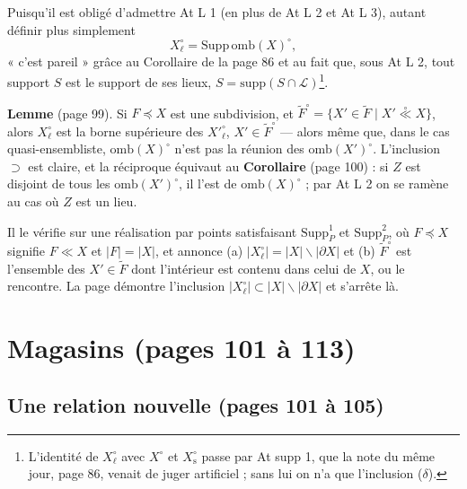 \documentclass[11pt,a4paper]{article}
\begin{document}
Puisqu'il est obligé d'admettre At L 1 (en plus de At L 2 et At L 3), autant
définir plus simplement
\[
X^{\circ}_{\ell} = \mathrm{Supp}\, \mathrm{omb}(X)^{\circ} ,
\]
« c'est pareil » grâce au Corollaire de la page 86 et au fait que, sous At L 2,
tout support $S$ est le support de ses lieux, $S = \mathrm{supp}(S \cap
\mathcal{L})$\footnote{L'identité de $X^{\circ}_{\ell}$ avec $X^{\circ}$ et
$X^{\circ}_{\mathrm{s}}$ passe par At supp 1, que la note du même jour, page 86,
venait de juger artificiel ; sans lui on n'a que l'inclusion ($\delta$).}.

\textbf{Lemme} (page 99). Si $F \preccurlyeq X$ est une subdivision, et
$\widetilde{F}^{\circ} = \{X' \in \widetilde{F} \mid X'
\mathrel{\overset{\circ}{\ll}} X\}$, alors $X^{\circ}_{\ell}$ est la borne
supérieure des $X'^{\circ}_{\ell}$, $X' \in \widetilde{F}^{\circ}$ --- alors même
que, dans le cas quasi-ensembliste, $\mathrm{omb}(X)^{\circ}$ n'est pas la réunion
des $\mathrm{omb}(X')^{\circ}$. L'inclusion $\supset$ est claire, et la réciproque
équivaut au \textbf{Corollaire} (page 100) : si $Z$ est disjoint de tous les
$\mathrm{omb}(X')^{\circ}$, il l'est de $\mathrm{omb}(X)^{\circ}$ ; par At L 2 on se
ramène au cas où $Z$ est un lieu.

Il le vérifie sur une réalisation par points satisfaisant $\mathrm{Supp}^{1}_{P}$
et $\mathrm{Supp}^{2}_{P}$, où $F \preccurlyeq X$ signifie $F \ll X$ et $|F| = |X|$,
et annonce (a) $|X^{\circ}_{\ell}| = |X| \smallsetminus |\partial X|$ et (b)
$\widetilde{F}^{\circ}$ est l'ensemble des $X' \in \widetilde{F}$ dont l'intérieur
est contenu dans celui de $X$, ou le rencontre. La page démontre l'inclusion
$|X^{\circ}_{\ell}| \subset |X| \smallsetminus |\partial X|$ et s'arrête là.

\section*{Magasins (pages 101 à 113)}

\subsection*{Une relation nouvelle (pages 101 à 105)}
\end{document}
